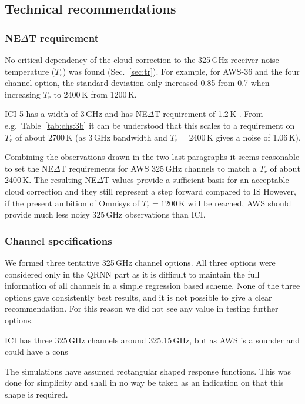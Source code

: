 \documentclass[12pt]{article}
\begin{document}
\subsection{Technical recommendations}
%

\subsubsection{NE$\Delta$T requirement}
%
No critical dependency of the cloud correction to the 325\,GHz receiver noise
temperature ($T_r$) was found (Sec.~\ref{sec:tr}). For example, for AWS-36 and
the four channel option, the standard deviation only increased 0.85 from 0.7
when increasing $T_r$ to 2400\,K from 1200\,K.

ICI-5 has a width of 3\,GHz and has NE$\Delta$T requirement of 1.2\,K
\citep{eriksson:towar:20}. From e.g.\ Table~\ref{tab:chs:3b} it can be
understood that this scales to a requirement on $T_r$ of about 2700\,K (as
3\,GHz bandwidth and $T_r=2400$\,K gives a noise of 1.06\,K).

Combining the observations drawn in the two last paragraphs it seems reasonable
to set the NE$\Delta$T requirements for AWS 325\,GHz channels to match a $T_r$
of about 2400\,K. The resulting NE$\Delta$T values provide a sufficient basis
for an acceptable cloud correction and they still represent a step forward
compared to IS However, if the present ambition of Omnisys of $T_r=1200$\,K
will be reached, AWS should provide much less noisy 325\,GHz observations than
ICI.



\subsubsection{Channel specifications}
%
We formed three tentative 325\,GHz channel options. All three options were
considered only in the QRNN part as it is difficult to maintain the full
information of all channels in a simple regression based scheme. None of the
three options gave consistently best results, and it is not possible to give a
clear recommendation. For this reason we did not see any value in testing
further options.

ICI has three 325\,GHz channels around 325.15\,GHz, but as AWS is a sounder and
could have a cons




The simulations have assumed rectangular shaped response functions. This was
done for simplicity and shall in no way be taken as an indication on that this
shape is required.
\end{document}
